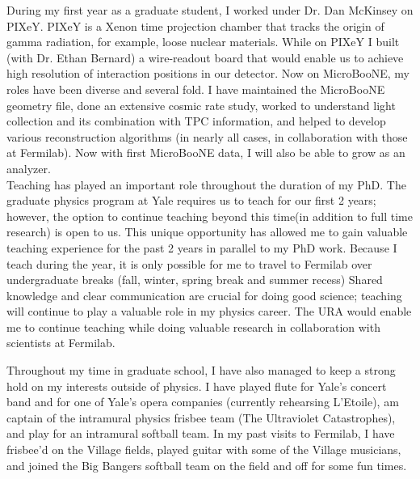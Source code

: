 \documentclass[12pt]{article}
\begin{document}
\par During my first year as a graduate student, I worked under Dr. Dan McKinsey on PIXeY. PIXeY is a Xenon time projection chamber that tracks the origin of gamma radiation, for example, loose nuclear materials. While on PIXeY I built (with Dr. Ethan Bernard) a wire-readout board that would enable us to achieve high resolution of interaction positions in our detector.  Now on MicroBooNE, my roles have been diverse and several fold. I have maintained the MicroBooNE geometry file, done an extensive cosmic rate study, worked to understand light collection and its combination with TPC information, and helped to develop various reconstruction algorithms (in nearly all cases, in collaboration with those at Fermilab). Now with first MicroBooNE data, I will also be able to grow as an analyzer. \\

Teaching has played an important role throughout the duration of my PhD. The graduate physics program at Yale requires us to teach for our first 2 years; however, the option to continue teaching beyond this time(in addition to full time research) is open to us.  This unique opportunity has allowed me to gain valuable teaching experience for the past 2 years in parallel to my PhD work. Because I teach during the year, it is only possible for me to travel to Fermilab over undergraduate breaks (fall, winter, spring break and summer recess) Shared knowledge and clear communication are crucial for doing good science; teaching will continue to play a valuable role in my physics career. The URA would enable me to continue teaching while doing valuable research in collaboration with scientists at Fermilab. \\

\par Throughout my time in graduate school, I have also managed to keep a strong hold on my interests outside of physics.  I have played flute for Yale's concert band and for one of Yale's opera companies (currently rehearsing L'Etoile), am captain of the intramural physics frisbee team (The Ultraviolet Catastrophes), and play for an intramural softball team. In my past visits to Fermilab, I have frisbee'd on the Village fields, played guitar with some of the Village musicians, and joined the Big Bangers softball team on the field and off for some fun times. \\
\end{document}
